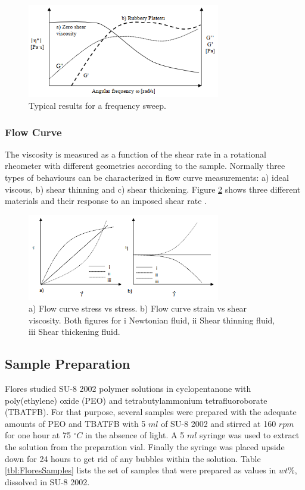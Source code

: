 \begin{figure}[th]
\centering
\includegraphics[width=0.75\textwidth]{./Figures/freqSweep.png}
\decoRule
\caption[Frequency Sweep]{Typical results for a frequency sweep. \cite{Flores2017}}
\label{fig:freqSweep}
\end{figure}

\subsubsection{Flow Curve}
The viscosity is measured as a function of the shear rate in a rotational rheometer with different geometries according to the sample. Normally three types of behaviours can be characterized in flow curve measurements: a) ideal viscous, b) shear thinning and c) shear thickening. Figure \ref{fig:flowCurve} shows three different materials and their response to an imposed shear rate \cite{Flores2017}.

\begin{figure}[th]
\centering
\includegraphics[width=0.75\textwidth]{./Figures/flowCurve.png}
\decoRule
\caption[Flow Curves]{a) Flow curve stress vs stress. b) Flow curve strain vs shear viscosity. Both figures for i Newtonian fluid, ii Shear thinning fluid, iii Shear thickening fluid. \cite{Flores2017}}
\label{fig:flowCurve}
\end{figure}

\subsection{Sample Preparation}
Flores studied SU-8 2002 polymer solutions in cyclopentanone with poly(ethylene) oxide (PEO) and tetrabutylammonium tetrafluoroborate (TBATFB). For that purpose, several samples were prepared with the adequate amounts of PEO and TBATFB with 5 $m l$ of SU-8 2002 and stirred at 160 $r p m$ for one hour at 75 $^\circ C$ in the absence of light. A 5 $m l$ syringe was used to extract the solution from the preparation vial. Finally the syringe was placed upside down for 24 hours to get rid of any bubbles within the solution. Table \ref{tbl:FloresSamples} lists the set of samples that were prepared as values in $w t \%$, dissolved in SU-8 2002.

